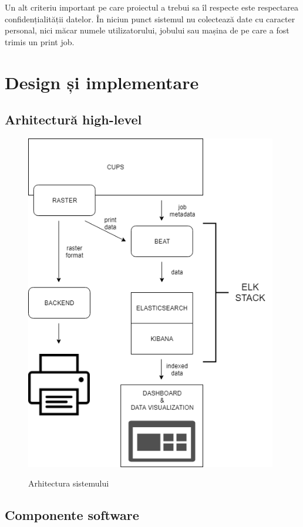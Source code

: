 \documentclass[a4paper, 12pt, twoside]{report}
\begin{document}
Un alt criteriu important pe care proiectul a trebui sa îl respecte este respectarea confidențialității datelor. În niciun punct sistemul nu colectează date cu caracter personal, nici măcar numele utilizatorului, jobului sau mașina de pe care a fost trimis un print job. 


\chapter{Design și implementare}

	\section{Arhitectură high-level}

		\begin{figure}[h]
			\centering
				{\includegraphics[width=110mm]{cups.png}}
			\caption{Arhitectura sistemului}
		\end{figure}

	\section{Componente software}
\end{document}
